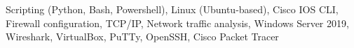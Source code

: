 Scripting (Python, Bash, Powershell),
Linux (Ubuntu-based),
Cisco IOS CLI,
Firewall configuration,
TCP/IP,
Network traffic analysis,
Windows Server 2019,
Wireshark,
VirtualBox,
PuTTy,
OpenSSH,
Cisco Packet Tracer